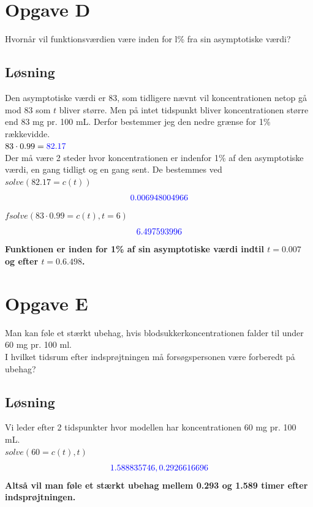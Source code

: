 \documentclass[a4paper, 11pt]{article}
\begin{document}
\section*{Opgave D} 
Hvornår vil funktionsværdien være inden for l\% fra sin asymptotiske værdi?
\subsection*{Løsning}
Den asymptotiske værdi er 83, som tidligere nævnt vil koncentrationen netop gå mod 83 som \(t\) bliver større. 
Men på intet tidspunkt bliver koncentrationen større end 83 mg pr. 100 mL. Derfor bestemmer jeg den nedre grænse for 1\% rækkevidde.\\ 
\(83 \cdot 0.99 = \textcolor{blue}{82.17}\)\\
Der må være 2 steder hvor koncentrationen er indenfor 1\% af den asymptotiske værdi, en gang tidligt og en gang sent. De bestemmes ved\\
\(solve(82.17=c(t))\)
\[\textcolor{blue}{0.006948004966}\]
\(\mathit{fsolve}\left(83\cdot  0.99=c\left(t\right),t=6\right)\)
\[\textcolor{blue}{6.497593996}\]
\textbf{Funktionen er inden for 1\% af sin asymptotiske værdi indtil \(t=0.007\) og efter \(t=0.6.498\).}
\section*{Opgave E} 
Man kan føle et stærkt ubehag, hvis blodsukkerkoncentrationen falder til under 60 mg pr. 100 ml. \\
I hvilket tidsrum efter indsprøjtningen må forsøgspersonen være forberedt på ubehag?
\subsection*{Løsning}
Vi leder efter 2 tidspunkter hvor modellen har koncentrationen 60 mg pr. 100 mL. \\
\(solve(60 = c(t),t)\)
\[\textcolor{blue}{ 1.588835746, 0.2926616696}\]
\textbf{Altså vil man føle et stærkt ubehag mellem 0.293 og 1.589 timer efter indsprøjtningen.}
\end{document}
